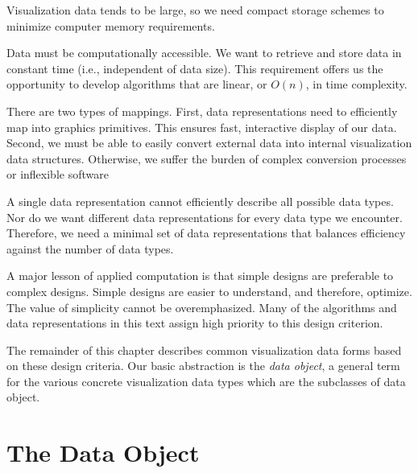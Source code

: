 {
\begin{description}[leftmargin=0.05\linewidth,labelindent=0.05\linewidth]

\item[\textit{Compact.}] Visualization data tends to be large, so we need compact storage schemes to minimize computer memory requirements.

\item[\textit{Efficient.}] Data must be computationally accessible. We want to retrieve and store data in constant time (i.e., independent of data size). This requirement offers us the opportunity to develop algorithms that are linear, or $O(n)$, in time complexity.

\item[\textit{Mappable.}] There are two types of mappings. First, data representations need to efficiently map into graphics primitives. This ensures fast, interactive display of our data. Second, we must be able to easily convert external data into internal visualization data structures. Otherwise, we suffer the burden of complex conversion processes or inflexible software

\item[\textit{Minimal Coverage.}] A single data representation cannot efficiently describe all possible data types. Nor do we want different data representations for every data type we encounter. Therefore, we need a minimal set of data representations that balances efficiency against the number of data types.

\item[\textit{Simple.}] A major lesson of applied computation is that simple designs are preferable to complex designs. Simple designs are easier to understand, and therefore, optimize. The value of simplicity cannot be overemphasized. Many of the algorithms and data representations in this text assign high priority to this design criterion.

\end{description}
}

The remainder of this chapter describes common visualization data forms based on these design criteria. Our basic abstraction is the \emph{data object}, a general term for the various concrete visualization data types which are the subclasses of data object. 

\section{The Data Object}

